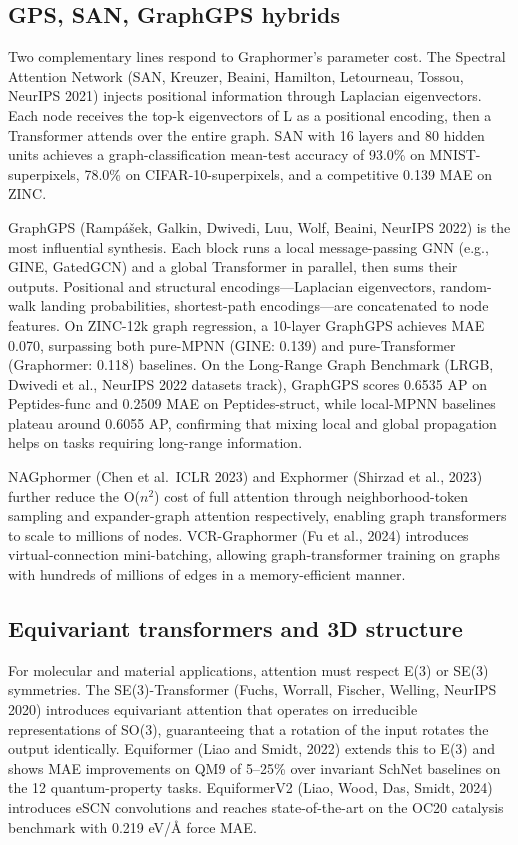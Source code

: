 \subsection{GPS, SAN, GraphGPS hybrids}\label{gps-san-graphgps-hybrids}

Two complementary lines respond to Graphormer's parameter cost. The Spectral Attention Network (SAN, Kreuzer, Beaini, Hamilton, Letourneau, Tossou, NeurIPS 2021) injects positional information through Laplacian eigenvectors. Each node receives the top-k eigenvectors of L as a positional encoding, then a Transformer attends over the entire graph. SAN with 16 layers and 80 hidden units achieves a graph-classification mean-test accuracy of 93.0\% on MNIST-superpixels, 78.0\% on CIFAR-10-superpixels, and a competitive 0.139 MAE on ZINC.

GraphGPS (Rampášek, Galkin, Dwivedi, Luu, Wolf, Beaini, NeurIPS 2022) is the most influential synthesis. Each block runs a local message-passing GNN (e.g., GINE, GatedGCN) and a global Transformer in parallel, then sums their outputs. Positional and structural encodings---Laplacian eigenvectors, random-walk landing probabilities, shortest-path encodings---are concatenated to node features. On ZINC-12k graph regression, a 10-layer GraphGPS achieves MAE 0.070, surpassing both pure-MPNN (GINE: 0.139) and pure-Transformer (Graphormer: 0.118) baselines. On the Long-Range Graph Benchmark (LRGB, Dwivedi et al., NeurIPS 2022 datasets track), GraphGPS scores 0.6535 AP on Peptides-func and 0.2509 MAE on Peptides-struct, while local-MPNN baselines plateau around 0.6055 AP, confirming that mixing local and global propagation helps on tasks requiring long-range information.

NAGphormer (Chen et al.~ICLR 2023) and Exphormer (Shirzad et al., 2023) further reduce the O(\(n^2\)) cost of full attention through neighborhood-token sampling and expander-graph attention respectively, enabling graph transformers to scale to millions of nodes. VCR-Graphormer (Fu et al., 2024) introduces virtual-connection mini-batching, allowing graph-transformer training on graphs with hundreds of millions of edges in a memory-efficient manner.

\subsection{Equivariant transformers and 3D structure}\label{equivariant-transformers-and-3d-structure}

For molecular and material applications, attention must respect E(3) or SE(3) symmetries. The SE(3)-Transformer (Fuchs, Worrall, Fischer, Welling, NeurIPS 2020) introduces equivariant attention that operates on irreducible representations of SO(3), guaranteeing that a rotation of the input rotates the output identically. Equiformer (Liao and Smidt, 2022) extends this to E(3) and shows MAE improvements on QM9 of 5--25\% over invariant SchNet baselines on the 12 quantum-property tasks. EquiformerV2 (Liao, Wood, Das, Smidt, 2024) introduces eSCN convolutions and reaches state-of-the-art on the OC20 catalysis benchmark with 0.219 eV/Å force MAE.

